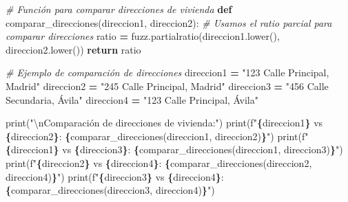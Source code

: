 \documentclass[
  a4paper,
  DIV=11,
  numbers=noendperiod]{scrreprt}
\newenvironment{Shaded}{\begin{snugshade}}{\end{snugshade}}
\newcommand{\BuiltInTok}[1]{#1}
\newcommand{\CharTok}[1]{\textcolor[rgb]{0.31,0.60,0.02}{#1}}
\newcommand{\CommentTok}[1]{\textcolor[rgb]{0.56,0.35,0.01}{\textit{#1}}}
\newcommand{\ControlFlowTok}[1]{\textcolor[rgb]{0.13,0.29,0.53}{\textbf{#1}}}
\newcommand{\KeywordTok}[1]{\textcolor[rgb]{0.13,0.29,0.53}{\textbf{#1}}}
\newcommand{\NormalTok}[1]{#1}
\newcommand{\OperatorTok}[1]{\textcolor[rgb]{0.81,0.36,0.00}{\textbf{#1}}}
\newcommand{\SpecialCharTok}[1]{\textcolor[rgb]{0.81,0.36,0.00}{\textbf{#1}}}
\newcommand{\SpecialStringTok}[1]{\textcolor[rgb]{0.31,0.60,0.02}{#1}}
\newcommand{\StringTok}[1]{\textcolor[rgb]{0.31,0.60,0.02}{#1}}
\begin{document}
\begin{Shaded}
\begin{Highlighting}[numbers=left,,]
\CommentTok{\# Función para comparar direcciones de vivienda}
\KeywordTok{def}\NormalTok{ comparar\_direcciones(direccion1, direccion2):}
    \CommentTok{\# Usamos el ratio parcial para comparar direcciones}
\NormalTok{    ratio }\OperatorTok{=}\NormalTok{ fuzz.partialratio(direccion1.lower(), direccion2.lower())}
    \ControlFlowTok{return}\NormalTok{ ratio}

\CommentTok{\# Ejemplo de comparación de direcciones}
\NormalTok{direccion1 }\OperatorTok{=} \StringTok{"123 Calle Principal, Madrid"}
\NormalTok{direccion2 }\OperatorTok{=} \StringTok{"245 Calle Principal, Madrid"}
\NormalTok{direccion3 }\OperatorTok{=} \StringTok{"456 Calle Secundaria, Ávila"}
\NormalTok{direccion4 }\OperatorTok{=} \StringTok{"123 Calle Principal, Ávila"}

\BuiltInTok{print}\NormalTok{(}\StringTok{"}\CharTok{\textbackslash{}n}\StringTok{Comparación de direcciones de vivienda:"}\NormalTok{)}
\BuiltInTok{print}\NormalTok{(}\SpecialStringTok{f"}\SpecialCharTok{\{}\NormalTok{direccion1}\SpecialCharTok{\}}\SpecialStringTok{ vs }\SpecialCharTok{\{}\NormalTok{direccion2}\SpecialCharTok{\}}\SpecialStringTok{: }\SpecialCharTok{\{}\NormalTok{comparar\_direcciones(direccion1, direccion2)}\SpecialCharTok{\}}\SpecialStringTok{"}\NormalTok{)}
\BuiltInTok{print}\NormalTok{(}\SpecialStringTok{f"}\SpecialCharTok{\{}\NormalTok{direccion1}\SpecialCharTok{\}}\SpecialStringTok{ vs }\SpecialCharTok{\{}\NormalTok{direccion3}\SpecialCharTok{\}}\SpecialStringTok{: }\SpecialCharTok{\{}\NormalTok{comparar\_direcciones(direccion1, direccion3)}\SpecialCharTok{\}}\SpecialStringTok{"}\NormalTok{)}
\BuiltInTok{print}\NormalTok{(}\SpecialStringTok{f"}\SpecialCharTok{\{}\NormalTok{direccion2}\SpecialCharTok{\}}\SpecialStringTok{ vs }\SpecialCharTok{\{}\NormalTok{direccion4}\SpecialCharTok{\}}\SpecialStringTok{: }\SpecialCharTok{\{}\NormalTok{comparar\_direcciones(direccion2, direccion4)}\SpecialCharTok{\}}\SpecialStringTok{"}\NormalTok{)}
\BuiltInTok{print}\NormalTok{(}\SpecialStringTok{f"}\SpecialCharTok{\{}\NormalTok{direccion3}\SpecialCharTok{\}}\SpecialStringTok{ vs }\SpecialCharTok{\{}\NormalTok{direccion4}\SpecialCharTok{\}}\SpecialStringTok{: }\SpecialCharTok{\{}\NormalTok{comparar\_direcciones(direccion3, direccion4)}\SpecialCharTok{\}}\SpecialStringTok{"}\NormalTok{)}
\end{Highlighting}
\end{Shaded}
\end{document}
